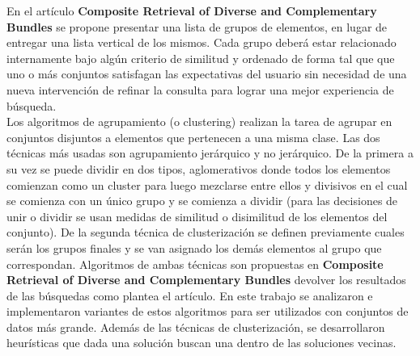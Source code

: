 En el  artículo \textbf{Composite Retrieval of Diverse and Complementary Bundles}\cite{compositeRetrival} se propone presentar una lista de grupos de elementos, en lugar de entregar una lista vertical de los mismos. Cada grupo deberá estar relacionado internamente bajo algún criterio de similitud y ordenado de forma tal que que uno o más conjuntos satisfagan las expectativas del usuario sin necesidad de una nueva intervención de refinar la consulta para lograr una mejor experiencia de búsqueda.\\
Los algoritmos de agrupamiento (o clustering) realizan la tarea de agrupar en conjuntos disjuntos a elementos que pertenecen a una misma clase. Las dos técnicas más usadas son agrupamiento jerárquico y no jerárquico. De la primera a su vez se puede dividir en dos tipos, aglomerativos donde todos los elementos comienzan como un cluster para luego mezclarse entre ellos y divisivos en el cual se comienza con un único grupo y se comienza a dividir (para las decisiones de unir o dividir se usan medidas de similitud o disimilitud de los elementos del conjunto). De la segunda técnica de clusterización se definen previamente cuales serán los grupos finales y se van asignado los demás elementos al grupo que correspondan. Algoritmos de ambas técnicas son propuestas en \textbf{Composite Retrieval of Diverse and Complementary Bundles} devolver los resultados de las búsquedas como plantea el artículo. En este trabajo se analizaron e implementaron variantes de estos algoritmos para ser utilizados con conjuntos de datos más grande. Además de las técnicas de clusterización, se desarrollaron heurísticas que dada una solución buscan una dentro de las soluciones vecinas.\\

